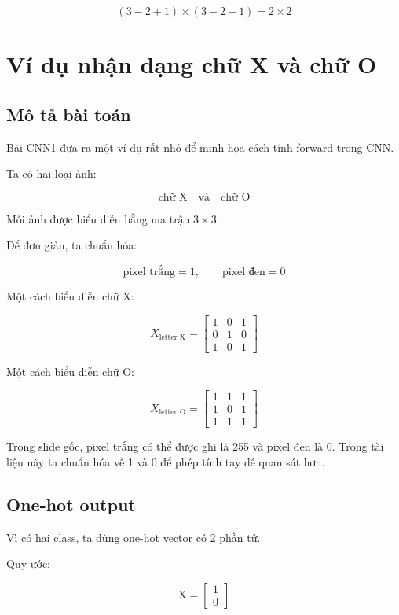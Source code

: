 \documentclass[12pt,a4paper]{report}
\begin{document}
\[
    (3-2+1)\times(3-2+1)=2\times2
\]

\chapter{Ví dụ nhận dạng chữ X và chữ O}

\section{Mô tả bài toán}

Bài CNN1 đưa ra một ví dụ rất nhỏ để minh họa cách tính forward trong CNN.

Ta có hai loại ảnh:

\[
    \text{chữ X}
    \quad \text{và} \quad
    \text{chữ O}
\]

Mỗi ảnh được biểu diễn bằng ma trận $3\times3$.

Để đơn giản, ta chuẩn hóa:

\[
    \text{pixel trắng}=1,\qquad \text{pixel đen}=0
\]

Một cách biểu diễn chữ X:

\[
    X_{\text{letter X}}
    =
    \begin{bmatrix}
    1 & 0 & 1\\
    0 & 1 & 0\\
    1 & 0 & 1
    \end{bmatrix}
\]

Một cách biểu diễn chữ O:

\[
    X_{\text{letter O}}
    =
    \begin{bmatrix}
    1 & 1 & 1\\
    1 & 0 & 1\\
    1 & 1 & 1
    \end{bmatrix}
\]

\begin{luuy}
Trong slide gốc, pixel trắng có thể được ghi là 255 và pixel đen là 0. Trong tài liệu này ta chuẩn hóa về 1 và 0 để phép tính tay dễ quan sát hơn.
\end{luuy}

\section{One-hot output}

Vì có hai class, ta dùng one-hot vector có 2 phần tử.

Quy ước:

\[
    \text{X}
    =
    \begin{bmatrix}
    1\\0
    \end{bmatrix}
\]
\end{document}
